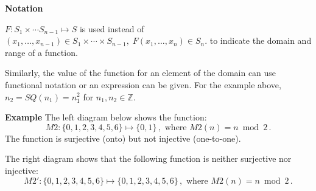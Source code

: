 \documentclass[12pt,a4paper]{article}
\newenvironment{example}{\textbf{Example}}{}
\begin{document}
\textbf{Notation}

$F:S_1\times \cdots S_{n-1}\mapsto S$ is used instead of $(x_{1},\ldots,x_{n-1})\in S_{1}\times \cdots \times S_{n-1},\; F(x_{1},\ldots,x_{n})\in S_n$. to indicate the domain and range of a function.

Similarly, the value of the function for an element of the domain can use functional notation or an expression can be given. For the example above, $n_2=SQ(n_1)=n_1^2$ for $n_1,n_2\in \mathbb{Z}$.


\begin{example}
The left diagram below shows the function:
\[
M2: \{0,1,2,3,4,5,6\} \mapsto \{0,1\}\,, \textrm{\ where \ } M2(n) = n \bmod 2\,.
\]
The function is surjective (onto) but not injective (one-to-one).

The right diagram shows that the following function is neither surjective nor injective:
\[
M2': \{0,1,2,3,4,5,6\} \mapsto \{0,1,2,3,4,5,6\}\,, \textrm{\ where \ } M2(n) = n \bmod 2\,.
\]
\end{example}
\end{document}
